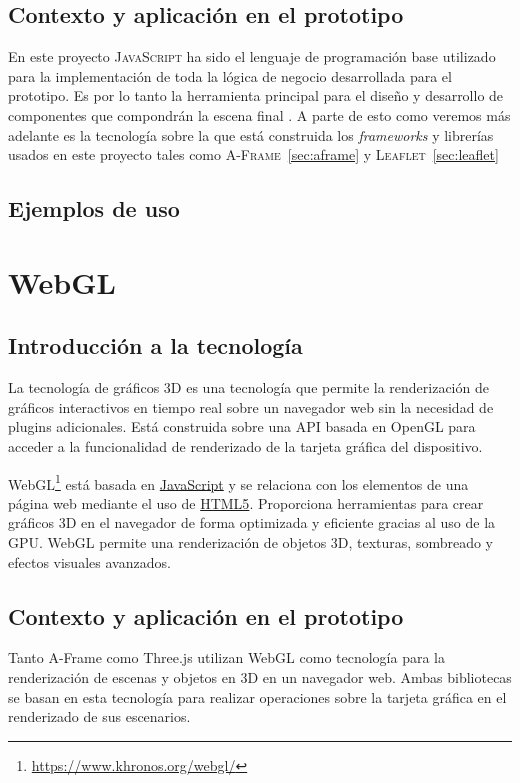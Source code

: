 \documentclass[a4paper, 11pt]{book}
\begin{document}
\subsection{Contexto y aplicación en el prototipo}
En este proyecto \textsc{JavaScript} ha sido el lenguaje de programación base utilizado para la implementación de toda la lógica de negocio desarrollada para el prototipo. Es por lo tanto la herramienta principal para el diseño y desarrollo de componentes que compondrán la escena final . A parte de esto como veremos más adelante es la tecnología sobre la que está construida los \emph{frameworks} y librerías usados en este proyecto tales como \textsc{A-Frame}~\ref{sec:aframe} y \textsc{Leaflet}~\ref{sec:leaflet}
\subsection{Ejemplos de uso}

\section{WebGL}
\label{sec:webgl}
\subsection{Introducción a la tecnología}
La tecnología de gráficos \Gls{3D} es una tecnología que permite la renderización de gráficos interactivos en tiempo real sobre un navegador web sin la necesidad de plugins adicionales. Está construida sobre una \Gls{API} basada en \Gls{OpenGL} para acceder a la funcionalidad de renderizado de la tarjeta gráfica del dispositivo.

WebGL\footnote{\url{https://www.khronos.org/webgl/}} está basada en \hyperref[sec:javascript]{JavaScript} y se relaciona con los elementos de una página web mediante el uso de \hyperref[sec:html5]{HTML5}. 
Proporciona herramientas para crear gráficos \Gls{3D} en el navegador de forma optimizada y eficiente gracias al uso de la \Gls{GPU}. WebGL permite una renderización de objetos 3D, texturas, sombreado y efectos visuales avanzados.
\subsection{Contexto y aplicación en el prototipo}
 Tanto A-Frame como Three.js utilizan WebGL como tecnología para la renderización de escenas y objetos en 3D en un navegador web. Ambas bibliotecas se basan en esta tecnología para realizar operaciones sobre la tarjeta gráfica en el renderizado de sus escenarios.
\end{document}

